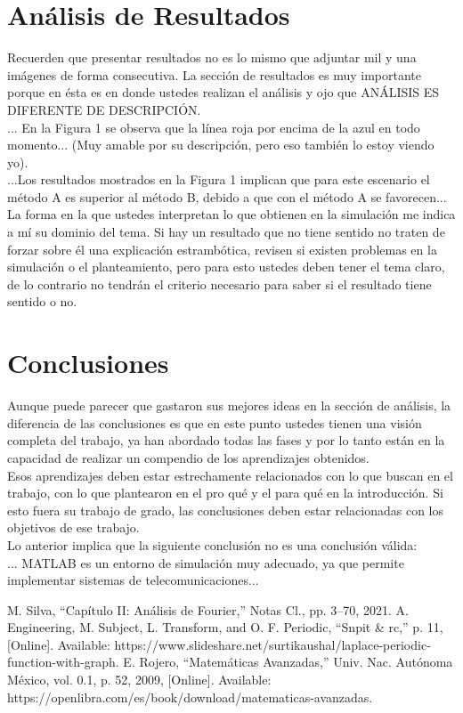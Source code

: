 \documentclass[12pt]{article}
\begin{document}
\section*{Análisis de Resultados}
    Recuerden que presentar resultados no es lo mismo que adjuntar mil y una imágenes de 
    forma consecutiva. La sección de resultados es muy importante porque en ésta es en 
    donde ustedes realizan el análisis y ojo que ANÁLISIS ES DIFERENTE DE DESCRIPCIÓN.\\
    ... En la Figura 1 se observa que la línea roja por encima de la azul en todo 
    momento... (Muy amable por su descripción, pero eso también lo estoy viendo yo).\\
    ...Los resultados mostrados en la Figura 1 implican que para este escenario el método A 
    es superior al método B, debido a que con el método A se favorecen...\\
    La forma en la que ustedes interpretan lo que obtienen en la simulación me indica a mí su 
    dominio del tema. Si hay un resultado que no tiene sentido no traten de forzar sobre él 
    una explicación estrambótica, revisen si existen problemas en la simulación o el 
    planteamiento, pero para esto ustedes deben tener el tema claro, de lo contrario no 
    tendrán el criterio necesario para saber si el resultado tiene sentido o no.
    
\section*{Conclusiones}
    Aunque puede parecer que gastaron sus mejores ideas en la sección de análisis, la 
    diferencia de las conclusiones es que en este punto ustedes tienen una visión completa 
    del trabajo, ya han abordado todas las fases y por lo tanto están en la capacidad de 
    realizar un compendio de los aprendizajes obtenidos.\\
    Esos aprendizajes deben estar estrechamente relacionados con lo que buscan en el 
    trabajo, con lo que plantearon en el pro qué y el para qué en la introducción. Si esto fuera 
    su trabajo de grado, las conclusiones deben estar relacionadas con los objetivos de ese 
    trabajo.\\
    Lo anterior implica que la siguiente conclusión no es una conclusión válida:\\
    ... MATLAB es un entorno de simulación muy adecuado, ya que permite implementar 
    sistemas de telecomunicaciones...

\begin{thebibliography}{99}
        M. Silva, “Capítulo II: Análisis de Fourier,” Notas Cl., pp. 3–70, 2021.
        A. Engineering, M. Subject, L. Transform, and O. F. Periodic, “Snpit \& rc,” p. 11, [Online]. Available: https://www.slideshare.net/surtikaushal/laplace-periodic-function-with-graph.
        E. Rojero, “Matemáticas Avanzadas,” Univ. Nac. Autónoma México, vol. 0.1, p. 52, 2009, [Online]. Available: https://openlibra.com/es/book/download/matematicas-avanzadas.
\end{thebibliography}
\end{document}
